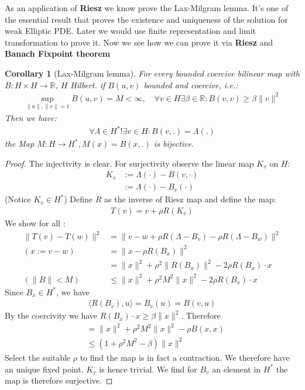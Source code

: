 \documentclass[a4paper,11pt,fleqn]{book}
\newtheorem{corollary}{Corollary}[theorem]
\theoremstyle{definition}
\theoremstyle{remark}
\begin{document}
As an application of \textbf{Riesz} we know prove the Lax-Milgram lemma. It's one of the essential result that proves the existence and uniqueness of the solution for weak Elliptic PDE. Later we would use finite representation and limit transformation to prove it. Now we see how we can prove it via \textbf{Riesz} and \textbf{Banach Fixpoint theorem}
\begin{corollary}[Lax-Milgram lemma]
	For every bounded coercive bilinear map with $B: H\times H \rightarrow \mathbb{R}$, $H$ Hilbert. if $B(u, v)$ bounded and coercive, i.e.:
	\begin{align*}
		\sup_{\|u\|, \|v\| = 1} B(u, v) = M < \infty, \quad \forall v \in H \exists \beta \in \mathbb{R}: B(v, v) \ge \beta\|v\|^2
	\end{align*}
	Then we have:
	\begin{align*}
		\forall \Lambda \in H^* !\exists v \in H: B(v, .) = \Lambda(.)
	\end{align*}
	the Map $M: H \rightarrow H^*, M(x) = B(x, .)$ is bijective. 
\end{corollary}
\begin{proof}
 	The injectivity is clear. For surjectivity observe the linear map $K_v$ on $H$:
	\begin{align*}
		K_v &:= \Lambda(\cdot) - B(v, \cdot) \\
		&:= \Lambda(\cdot) - B_v(\cdot)
	\end{align*}
	(Notice $K_v\in H^*$)
	Define $R$ as the inverse of Riesz map and define the map:
	\begin{align*}
		T(v) = v + \rho R(K_v)
	\end{align*}
	We show for all :
	\begin{align*}
		\|T(v) - T(w)\|^2 &= \|v - w + \rho R(\Lambda - B_v) - \rho R(\Lambda - B_w)   \|^2\\		
		(x:= v - w)
		&=\|x - \rho R(B_x)\|^2   \\
		&= \|x\|^2 + \rho^2 \|R(B_x)\|^2 - 2\rho R(B_x)\cdot x\\
		(\|B\|< M)
		&\le \|x\|^2 + \rho^2 M^2\|x\|^2 - 2\rho R(B_x) \cdot x
	\end{align*} 
	Since $B_x \in H^*$, we have 
	\begin{align*}
		\langle R(B_v), u \rangle  = B_v(u) = B(v, u)
	\end{align*} 
	By the coercivity we have $R(B_x)\cdot x \ge \beta \|x\|^2$. Therefore
	\begin{align*}
		&= \|x\|^2 + \rho^2 M^2\|x\|^2 - \rho B(x, x)\\
		&\le (1 + \rho^2M^2 - \beta) \|x\|^2
	\end{align*}
	Select the suitable $\rho$ to find the map is in fact a contraction. We therefore have an unique fixed point. $K_v$ is hence trivial. We find for $B_v$ an element in $H^*$ the map is therefore surjective. 
\end{proof}
\end{document}
